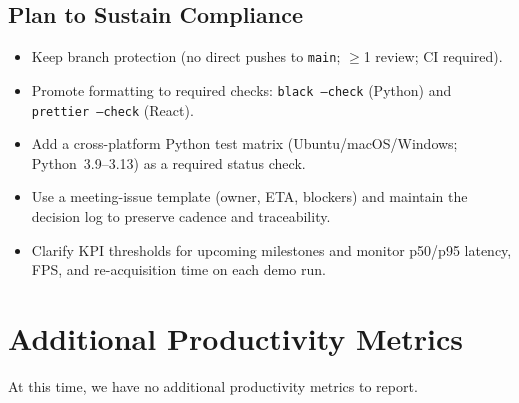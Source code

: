 \documentclass{article}
\begin{document}
\subsection*{Plan to Sustain Compliance}
\begin{itemize}
  \item Keep branch protection (no direct pushes to \texttt{main}; $\geq$1 review; CI
        required).
  \item Promote formatting to required checks: \texttt{black --check} (Python) and
        \texttt{prettier --check} (React).
  \item Add a cross-platform Python test matrix (Ubuntu/macOS/Windows;
        Python~3.9--3.13) as a required status check.
  \item Use a meeting-issue template (owner, ETA, blockers) and maintain the decision
        log to preserve cadence and traceability.
  \item Clarify KPI thresholds for upcoming milestones and monitor p50/p95 latency,
        FPS, and re-acquisition time on each demo run.
\end{itemize}

\section{Additional Productivity Metrics}

At this time, we have no additional productivity metrics to report.
\end{document}
